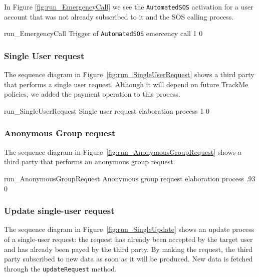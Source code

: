 \documentclass[../DD0.tex]{subfiles}
\begin{document}
      In Figure \ref{fig:run_EmergencyCall} we see the \texttt{AutomatedSOS} activation for a user account that was not already subscribed to it and the SOS calling process.

      \fetchUML
        {run_EmergencyCall}
        {Trigger of \texttt{AutomatedSOS} emercency call}
        {1}           %
        {0}           %

    \clearpage
    \subsubsection{Single User request}
    \label{sec:singleuser}

      The sequence diagram in Figure~\ref{fig:run_SingleUserRequest} shows a third party that performs a single user request. Although it will depend on future TrackMe policies, we added the payment operation to this process.

      \fetchUML
        {run_SingleUserRequest}
        {Single user request elaboration process}
        {1}           %
        {0}           %

    \clearpage
    \subsubsection{Anonymous Group request}
    \label{sec:anonymousgroup}

      The sequence diagram in Figure~\ref{fig:run_AnonymousGroupRequest} shows a third party that performs an anonymous group request.

      \fetchUML
        {run_AnonymousGroupRequest}
        {Anonymous group request elaboration process}
        {.93}           %
        {0}           %

    \clearpage

    \subsubsection{Update single-user request}
    \label{sec:updatesingledata}

      The sequence diagram in Figure~\ref{fig:run_SingleUpdate} shows an update process of a single-user request: the request has already been accepted by the target user and has already been payed by the third party. By making the request, the third party subscribed to new data as soon as it will be produced. New data is fetched through the \texttt{updateRequest} method.
\end{document}
